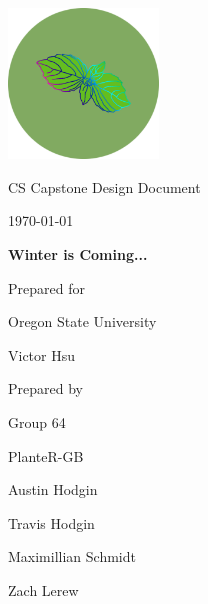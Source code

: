 \documentclass[onecolumn, draftclsnofoot,10pt, compsoc]{IEEEtran}
\def \CapstoneTeamName{			              			 PlanteR-GB}
\def \CapstoneTeamNumber{					           			 Group 64}
\def \GroupMemberOne{				           				Austin Hodgin}
\def \GroupMemberTwo{				           				Travis Hodgin}
\def \GroupMemberThree{			            Maximillian Schmidt}
\def\GroupMemberFour{		        	               Zach Lerew}
\def \CapstoneProjectName{	      	    Winter is Coming...}
\def \CapstoneSponsorCompany{		    Oregon State University}
\def \CapstoneSponsorPerson{		 			  				 Victor Hsu}
\def \DocType{		%
				Design Document
				}
\newcommand{\NameSigPair}[1]{\par
\makebox[2.75in][r]{#1} \hfil 	\makebox[3.25in]{\makebox[2.25in]{\hrulefill} \hfill		\makebox[.75in]{\hrulefill}}
\par\vspace{-12pt} \textit{\tiny\noindent
\makebox[2.75in]{} \hfil		\makebox[3.25in]{\makebox[2.25in][r]{Signature} \hfill	\makebox[.75in][r]{Date}}}}
\renewcommand{\NameSigPair}[1]{#1}
\begin{document}
\begin{titlepage}
    \begin{singlespace}
        \hfill

        \includegraphics[height=4cm]{logo.png}

        \par\vspace{.2in}
        \centering
        \scshape{
            \huge CS Capstone \DocType \par
            {\large\today}\par
            \vspace{.5in}
            \textbf{\Huge\CapstoneProjectName}\par

						\vspace{1in}

            {\large Prepared for}\par
            \Huge \CapstoneSponsorCompany\par
            \vspace{5pt}
            {\Large\NameSigPair{\CapstoneSponsorPerson}\par}

						\vspace{1in}

            {\large Prepared by}\par
						{\huge \CapstoneTeamNumber}\par
            \CapstoneTeamName\par
            \vspace{5pt}

            {
							\Large
							\NameSigPair{\GroupMemberOne}\par
							\NameSigPair{\GroupMemberTwo}\par
							\NameSigPair{\GroupMemberThree}\par
							\NameSigPair{\GroupMemberFour}\par
            }

}
\end{singlespace}
\end{titlepage}
\end{document}
